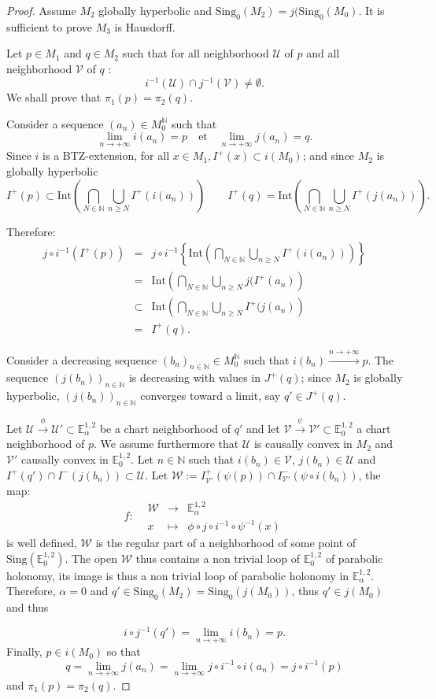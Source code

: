 \documentclass[a4paper,12pt]{article}
\def\U{\mathcal U}
\def\V{\mathcal V}
\def\N{\mathbb N}
\def\sing{\mathrm{Sing}}
\newcommand{\mass}[1]{{\mathbb E}^{1,2}_{#1}}
\newcommand{\fonction}[5]{\displaystyle#1:\begin{array}{l|rcl}
& \displaystyle #2 & \longrightarrow & \displaystyle #3 \\
    & \displaystyle #4 & \longmapsto & \displaystyle #5 \end{array}}
\begin{document}
					\begin{proof}
						Assume $M_2$ globally hyperbolic and $\sing_0(M_2)=j(\sing_0(M_0)$.	It is sufficient to prove $M_3$ is Hausdorff.
						
						Let $p\in M_1$ and $q\in M_2$ such that for all neighborhood 
						$\U$ of $p$ and all neighborhood $\V$ of $q$ :
						$$i^{-1}(\U)\cap j^{-1}(\V)\neq \emptyset.$$
						We shall prove that $\pi_1(p)=\pi_2(q)$.
						
						
						Consider a sequence $(a_n)\in M_0^\N$ such that $$   \lim_{n\rightarrow +\infty}i(a_n)=p \quad \text{et}\quad  \lim_{n\rightarrow +\infty}j(a_n)=q .$$
						Since $i$ is a BTZ-extension, for all $x\in M_1, I^+(x)\subset i(M_0)$; and since $M_2$ is globally hyperbolic
						$$ I^+(p) \subset \mathrm{Int}\left(\bigcap_{N\in \N } \bigcup_{n\geq N} I^+(i(a_n))\right) \quad\quad I^+(q) = \mathrm{Int}\left(\bigcap_{N\in \N } \bigcup_{n\geq N} I^+(j(a_n))\right)  .$$
						
						
Therefore: 
						\begin{eqnarray*}
						 j\circ i^{-1}(I^+(p))&= & j\circ i^{-1}\left\{ \mathrm{Int}\left(\bigcap_{N\in \N}\bigcup_{n\geq N} I^+(i(a_n))\right)\right\}\\
						 &=& \mathrm{Int}\left(\bigcap_{N\in \N}\bigcup_{n\geq N}j(I^+(a_n)\right)\\
						 &\subset& \mathrm{Int}\left(\bigcap_{N\in \N}\bigcup_{n\geq N} I^+(j(a_n)\right)\\
						 &=& I^+(q).
						\end{eqnarray*}
			
						Consider a decreasing sequence $(b_n)_{n\in \N}\in M_0^\N$ such that $i(b_n) \xrightarrow{n\rightarrow +\infty} p$.
						The sequence $\left(j(b_n)\right)_{n\in \N}$ is decreasing with values in $J^+(q)$; since $M_2$ is globally hyperbolic, $(j(b_n))_{n\in \N}$ converges toward a limit, say $q'\in J^+(q)$.
						
						Let $\U\xrightarrow{\phi} \U'\subset \mass{\alpha}$ be a chart neighborhood of $q'$ and let $\V\xrightarrow{\psi}\V'\subset \mass{0}$ a chart neighborhood of $p$. We assume furthermore that $\U$ is causally convex in $M_2$ and $\V'$ causally convex in $\mass{0}$. 
Let $n\in\N$ such that  $i(b_n)\in \V$, $j(b_n)\in \U$ and $I^+(q')\cap I^-(j(b_n))\subset \U$. Let  $\mathcal W:=I^+_{\V'}(\psi(p))\cap I^-_{\V'}(\psi\circ i(b_n))$, the map:
						$$ \fonction{f}{\mathcal W}{\mass{\alpha}}{x}{\phi\circ j\circ i^{-1}\circ \psi^{-1}(x)}$$
						is well defined, $\mathcal W$ is the regular part of a neighborhood of some point of $\sing(\mass{0})$. The open $\mathcal W$ thus contains a non trivial loop of $\mass{0}$ of parabolic holonomy, its image is thus a non trivial loop of parabolic holonomy in $\mass{\alpha}$. Therefore, $\alpha=0$ and
						$q'\in\sing_0(M_2)=\sing_0(j(M_0))$, thus $q'\in j(M_0)$ and thus
						
						$$i\circ j^{-1}(q')=\lim_{n\rightarrow +\infty} i(b_n) = p.$$ 
						 Finally, $p\in i(M_0)$ so that
						 $$q=\lim_{n\rightarrow +\infty}j(a_n)=\lim_{n\rightarrow +\infty}j\circ i^{-1}\circ i(a_n) = j\circ i^{-1}(p)$$
						 and $\pi_1(p)=\pi_2(q)$.
						
						
					\end{proof}
\end{document}
